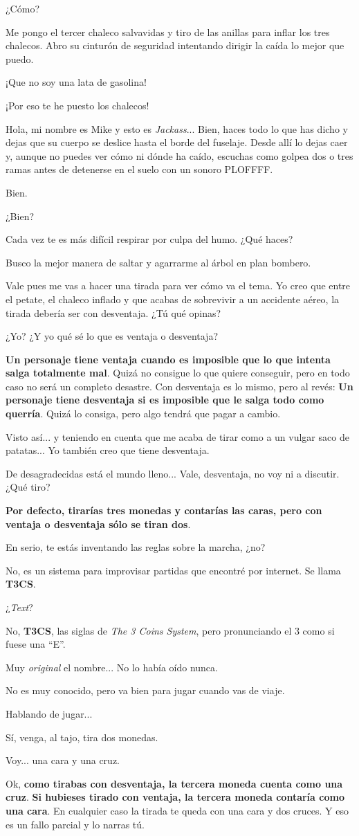 \documentclass[10pt, a5paper, twocolumn]{article}
\newcommand\E{\item[\raisebox{-0.25em}{\scalebox{0.75}{\bcicosaedre}}]}
\newcommand\B{\item[\raisebox{-0.25em}{\scalebox{0.75}{\bccube}}]}
\newcommand\A{\item[\raisebox{-0.25em}{\scalebox{0.75}{\bctetraedre}}]}
\newenvironment{dialogue}
    {\begin{description}[leftmargin=!,align=right,labelwidth=0.cm]}
    {\end{description}}
\begin{document}
\begin{dialogue}
        \A ¿Cómo?
        \B Me pongo el tercer chaleco salvavidas y tiro de las anillas para inflar los tres chalecos. Abro su cinturón de seguridad intentando dirigir la caída lo mejor que puedo.
        \A ¡Que no soy una lata de gasolina!
        \B ¡Por eso te he puesto los chalecos!
        \E Hola, mi nombre es Mike y esto es \emph{Jackass}... Bien, haces todo lo que has dicho y dejas que su cuerpo se deslice hasta el borde del fuselaje. Desde allí lo dejas caer y, aunque no puedes ver cómo ni dónde ha caído, escuchas como golpea dos o tres ramas antes de detenerse en el suelo con un sonoro PLOFFFF.
        \B Bien.
        \A ¿Bien?
        \E Cada vez te es más difícil respirar por culpa del humo. ¿Qué haces?
        \B Busco la mejor manera de saltar y agarrarme al árbol en plan bombero.
        \E Vale pues me vas a hacer una tirada para ver cómo va el tema. Yo creo que entre el petate, el chaleco inflado y que acabas de sobrevivir a un accidente aéreo, la tirada debería ser con desventaja. ¿Tú qué opinas?
        \A ¿Yo? ¿Y yo qué sé lo que es ventaja o desventaja?
        \E \textbf{Un personaje tiene ventaja cuando es imposible que lo que intenta salga totalmente mal}. Quizá no consigue lo que quiere conseguir, pero en todo caso no será un completo desastre. Con desventaja es lo mismo, pero al revés: \textbf{Un personaje tiene desventaja si es imposible que le salga todo como querría}. Quizá lo consiga, pero algo tendrá que pagar a cambio.
        \A Visto así... y teniendo en cuenta que me acaba de tirar como a un vulgar saco de patatas... Yo también creo que tiene desventaja.
        \B De desagradecidas está el mundo lleno... Vale, desventaja, no voy ni a discutir. ¿Qué tiro?
        \E \textbf{Por defecto, tirarías tres monedas y contarías las caras, pero con ventaja o desventaja sólo se tiran dos}.
        \B En serio, te estás inventando las reglas sobre la marcha, ¿no?
        \E No, es un sistema para improvisar partidas que encontré por internet. Se llama \textbf{T3CS}.
        \B ¿\emph{Text}?
        \E No, \textbf{T3CS}, las siglas de \emph{The 3 Coins System}, pero pronunciando el 3 como si fuese una ``E''.
        \B Muy \emph{original} el nombre... No lo había oído nunca.
        \E No es muy conocido, pero va bien para jugar cuando vas de viaje.
        \A Hablando de jugar...
        \E Sí, venga, al tajo, tira dos monedas.
        \B Voy... una cara y una cruz.
        \E Ok, \textbf{como tirabas con desventaja, la tercera moneda cuenta como una cruz}. \textbf{Si hubieses tirado con ventaja, la tercera moneda contaría como una cara}. En cualquier caso la tirada te queda con una cara y dos cruces. Y eso es un fallo parcial y lo narras tú.

\end{dialogue}
\end{document}
